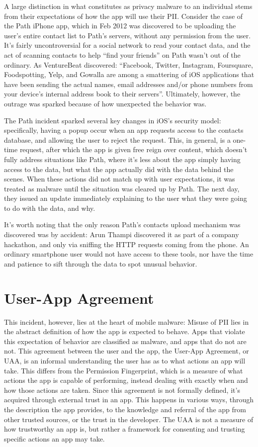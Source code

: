 A large distinction in what constitutes as privacy malware to an individual stems from their expectations of how the app will use their PII. Consider the case of the Path iPhone app, which in Feb 2012 was discovered to be uploading the user's entire contact list to Path's servers, without any permission from the user\citep{thampi2012}. It's fairly uncontroversial for a social network to read your contact data, and the act of scanning contacts to help ``find your friends'' on Path wasn't out of the ordinary. As VentureBeat discovered: ``Facebook, Twitter, Instagram, Foursquare, Foodspotting, Yelp, and Gowalla are among a smattering of iOS applications that have been sending the actual names, email addresses and/or phone numbers from your device's internal address book to their servers''\citep{vb2012addressbook}. Ultimately, however, the outrage was sparked because of how unexpected the behavior was.

The Path incident sparked several key changes in iOS's security model: specifically, having a popup occur when an app requests access to the contacts database, and allowing the user to reject the request. This, in general, is a one-time request, after which the app is given free reign over content\citep{AppleContacts}, which doesn't fully address situations like Path, where it's less about the app simply having access to the data, but what the app actually did with the data behind the scenes. When these actions did not match up with user expectations, it was treated as malware until the situation was cleared up by Path. The next day, they issued an update immediately explaining to the user what they were going to do with the data, and why.

It's worth noting that the only reason Path's contacts upload mechanism was discovered was by accident: Arun Thampi discovered it as part of a company hackathon, and only via sniffing the HTTP requests coming from the phone. An ordinary smartphone user would not have access to these tools, nor have the time and patience to sift through the data to spot unusual behavior.

\section{User-App Agreement}
This incident, however, lies at the heart of mobile malware: Misuse of PII lies in the abstract definition of how the app is expected to behave. Apps that violate this expectation of behavior are classified as malware, and apps that do not are not. This agreement between the user and the app, the User-App Agreement, or UAA, is an informal understanding the user has as to what actions an app will take. This differs from the Permission Fingerprint, which is a measure of what actions the app is capable of performing, instead dealing with exactly when and how those actions are taken. Since this agreement is not formally defined, it's acquired through external trust in an app. This happens in various ways, through the description the app provides, to the knowledge and referral of the app from other trusted sources, or the trust in the developer. The UAA is not a measure of how trustworthy an app is, but rather a framework for consenting and trusting specific actions an app may take.

